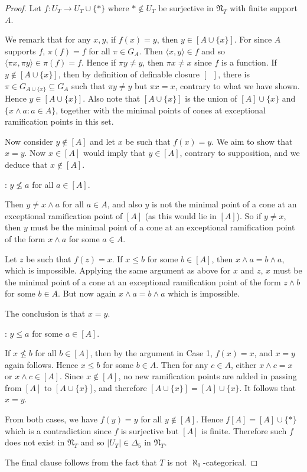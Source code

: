 \documentclass[10pt,a4paper]{amsart}
\begin{document}
\begin{proof} Let $f: U_T \to U_T \cup \{*\}$ where $* \not \in U_T$ be surjective in ${\mathfrak N}_T$ with finite 
support $A$.

We remark that for any $x, y$, if $f(x) = y$, then $y \in [A \cup \{x\}]$. For since $A$ supports $f$, $\pi(f) = f$ 
for all $\pi \in G_A$. Then $\langle x, y \rangle \in f$ and so $\langle \pi x, \pi y \rangle \in \pi(f) = f$. Hence if 
$\pi y \neq y$, then $\pi x \neq x$ since $f$ is a function. If $y \not \in [A \cup \{x\}]$, then by definition of 
definable closure $[ \;\;]$, there is $\pi \in G_{A \cup \{x\}} \subseteq G_A$ such that $\pi y \neq y$ but $\pi x = x$, 
contrary to what we have shown. Hence $y \in [A \cup \{x\}]$. Also note that $[A \cup \{x\}]$ is the union of 
$[A] \cup \{x\}$ and $\{x \wedge a: a \in A\}$, together with the minimal points of cones at exceptional ramification 
points in this set. 

Now consider $y \not \in [A]$ and let $x$ be such that $f(x) = y$. We aim to show that $x = y$. Now $x \in [A]$ would imply 
that $y \in [A]$, contrary to supposition, and we deduce that $x \not \in [A]$.

: $y \not \le a$ for all $a \in [A]$.

Then $y \neq x \wedge a$ for all $a \in A$, and also $y$ is not the minimal point of a cone at an exceptional ramification 
point of $[A]$ (as this would lie in $[A]$). So if $y \neq x$, then $y$ must be the minimal point of a cone at an exceptional
ramification point of the form $x \wedge a$ for some $a \in A$. 

Let $z$ be such that $f(z) = x$. If $x \le b$ for some $b \in [A]$, then $x \wedge a = b \wedge a$, which is impossible.
Applying the same argument as above for $x$ and $z$, $x$ must be the minimal point of a cone at an exceptional ramification
point of the form $z \wedge b$ for some $b \in A$. But now again $x \wedge a = b \wedge a$ which is impossible.

The conclusion is that $x = y$.

: $y \le a$ for some $a \in [A]$.

If $x \not \le b$ for all $b \in [A]$, then by the argument in Case 1, $f(x) = x$, and $x = y$ again follows. Hence $x \le b$
for some $b \in A$. Then for any $c \in A$, either $x \wedge c = x$ or $x \wedge c \in [A]$. Since $x \not \in [A]$, no new
ramification points are added in passing from $[A]$ to $[A \cup \{x\}]$, and therefore $[A \cup \{x\}] = [A] \cup \{x\}$. It 
follows that $x = y$. 

From both cases, we have $f(y) = y$ for all $y \not \in [A]$. Hence $f[A] = [A] \cup \{*\}$ which is a 
contradiction since $f$ is surjective but $[A]$ is finite. Therefore such $f$ does not exist
in ${\mathfrak N}_T$ and so $|U_T| \in \Delta_5$ in ${\mathfrak N}_T$.  

The final clause follows from the fact that $T$ is not $\aleph_0$-categorical.  \end{proof}
\end{document}
